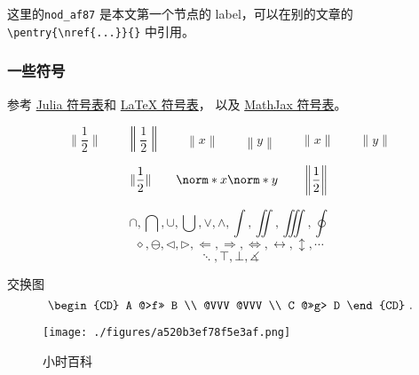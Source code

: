 

这里的\verb`nod_af87` 是本文第一个节点的 label，可以在别的文章的 \verb`\pentry{\nref{...}}{}` 中引用。

\subsubsection{一些符号}
参考 \href{https://docs.julialang.org/en/v1/manual/unicode-input/}{Julia 符号表}和 \href{https://oeis.org/wiki/List_of_LaTeX_mathematical_symbols}{LaTeX 符号表}， 以及 \href{http://www.onemathematicalcat.org/MathJaxDocumentation/TeXSyntax.htm}{MathJax 符号表}。

\begin{equation}
\|\frac12\| \qquad
\left\|\frac12\right\| \qquad
\left\|x\right\| \qquad
\left\|y\right\| \qquad
\|x\| \qquad
\|y\|~
\end{equation}

\begin{equation}
\lVert\frac12\rVert \qquad
\norm*{x} \norm*{y} \qquad
\left\lVert\frac12\right\rVert~
\end{equation}

\begin{equation}
\cap, \bigcap, \cup, \bigcup, \vee, \wedge, \int, \iint, \iiint, \oint~
\end{equation}
\begin{equation}
\diamond, \ominus, \triangleleft, \triangleright, \Longleftarrow, \Longrightarrow, \iff, \leftrightarrow, \updownarrow, \cdots~
\end{equation}
\begin{equation}
\ddots, \top, \bot, \measuredangle~
\end{equation}

交换图
\begin{equation}
\begin{CD}
A @>f>> B \\
@VVV @VVV \\
C @>>g> D
\end{CD}~.
\end{equation}

\begin{figure}[ht]
\centering
\texttt{[image: ./figures/a520b3ef78f5e3af.png]}
\caption{小时百科} \label{fig_test_1}
\end{figure}

